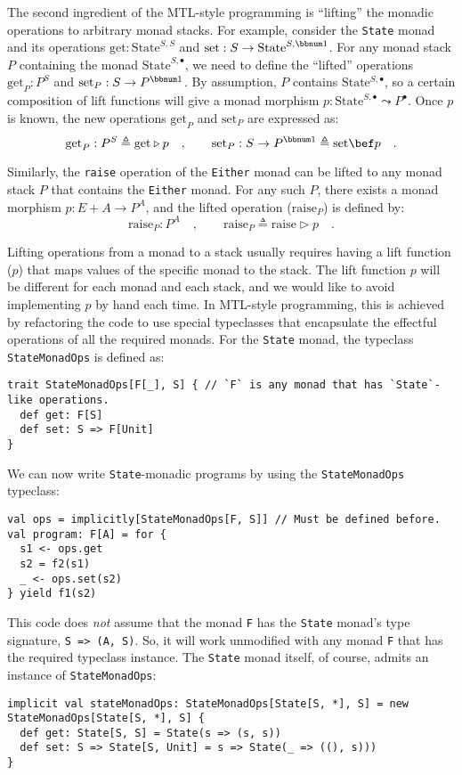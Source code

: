 The second ingredient of the MTL-style programming is \textsf{``}lifting\textsf{''}
the monadic operations to arbitrary monad stacks. For example, consider
the \lstinline!State! monad and its operations $\text{get}:\text{State}^{S,S}$
and $\text{set}:S\rightarrow\text{State}^{S,\bbnum 1}$. For any monad
stack $P$ containing the monad $\text{State}^{S,\bullet}$, we need
to define the \textsf{``}lifted\textsf{''} operations $\text{get}_{P}:P^{S}$ and
$\text{set}_{P}:S\rightarrow P^{\bbnum 1}$. By assumption, $P$ contains
$\text{State}{}^{S,\bullet}$, so a certain composition of lift functions
will give a monad morphism $p:\text{State}^{S,\bullet}\leadsto P^{\bullet}$.
Once $p$ is known, the new operations $\text{get}_{P}$ and $\text{set}_{P}$
are expressed as:
\[
\text{get}_{P}:P^{S}\triangleq\text{get}\triangleright p\quad,\quad\quad\text{set}_{P}:S\rightarrow P^{\bbnum 1}\triangleq\text{set}\bef p\quad.
\]

Similarly, the \lstinline!raise! operation of the \lstinline!Either!
monad can be lifted to any monad stack $P$ that contains the \lstinline!Either!
monad. For any such $P$, there exists a monad morphism $p:E+A\rightarrow P^{A}$,
and the lifted operation ($\text{raise}_{P}$) is defined by:
\[
\text{raise}_{P}:P^{A}\quad,\quad\quad\text{raise}_{P}\triangleq\text{raise}\triangleright p\quad.
\]

Lifting operations from a monad to a stack usually requires having
a lift function ($p$) that maps values of the specific monad to the
stack. The lift function $p$ will be different for each monad and
each stack, and we would like to avoid implementing $p$ by hand each
time. In MTL-style programming, this is achieved by refactoring the
code to use special typeclasses that encapsulate the effectful operations
of all the required monads. For the \lstinline!State! monad, the
typeclass \lstinline!StateMonadOps! is defined as:
\begin{lstlisting}
trait StateMonadOps[F[_], S] { // `F` is any monad that has `State`-like operations.
  def get: F[S]
  def set: S => F[Unit]
}
\end{lstlisting}
We can now write \lstinline!State!-monadic programs by using the
\lstinline!StateMonadOps! typeclass:
\begin{lstlisting}
val ops = implicitly[StateMonadOps[F, S]] // Must be defined before.
val program: F[A] = for {
  s1 <- ops.get
  s2 = f2(s1)
  _ <- ops.set(s2)
} yield f1(s2)
\end{lstlisting}
This code does \emph{not} assume that the monad \lstinline!F! has
the \lstinline!State! monad\textsf{'}s type signature, \lstinline!S => (A, S)!.
So, it will work unmodified with any monad \lstinline!F! that has
the required typeclass instance. The \lstinline!State! monad itself,
of course, admits an instance of \lstinline!StateMonadOps!:
\begin{lstlisting}
implicit val stateMonadOps: StateMonadOps[State[S, *], S] = new StateMonadOps[State[S, *], S] {
  def get: State[S, S] = State(s => (s, s))
  def set: S => State[S, Unit] = s => State(_ => ((), s)))
}
\end{lstlisting}

